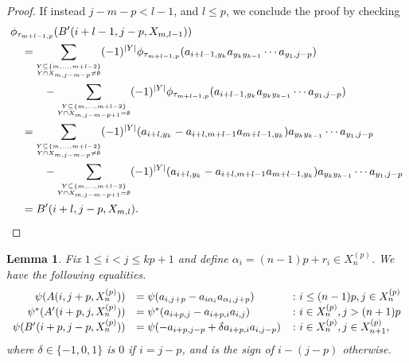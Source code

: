 \documentclass[11pt]{amsart}
\def\a{\alpha}
\newtheorem{lem}[thm]{Lemma}
\theoremstyle{definition}
\begin{document}
\begin{proof}
If instead $j-m-p <l - 1$, and $l\le p$, we conclude the proof by checking
{\small
\begin{align*}
&\phi_{\tau_{m + l - 1,p}}(B'(i+l-1,j-p,X_{m,l-1})) \\
&\quad = \sum_{{\scriptscriptstyle \overset{Y\subseteq \{m,\ldots,m+l-2\}}{Y\cap X_{m,j-m-p}\ne\emptyset}}}(-1)^{|Y|}\phi_{\tau_{m + l - 1,p}}(a_{i+l-1,y_k}a_{y_ky_{k-1}}\cdots a_{y_1,j-p}) \\
&\qquad\quad - \sum_{{\scriptscriptstyle \overset{Y\subseteq \{m,\ldots,m+l-2\}}{Y\cap X_{m,j-m-p+1}=\emptyset}}}(-1)^{|Y|}\phi_{\tau_{m + l - 1,p}}(a_{i+l-1,y_k}a_{y_ky_{k-1}}\cdots a_{y_1,j-p}) \\
&\quad = \sum_{{\scriptscriptstyle \overset{Y\subseteq \{m,\ldots,m+l-2\}}{Y\cap X_{m,j-m-p}\ne\emptyset}}}(-1)^{|Y|}(a_{i+l,y_k} - a_{i+l,m+l-1}a_{m+l-1,y_k})a_{y_ky_{k-1}}\cdots a_{y_1,j-p} \\
&\qquad\quad - \sum_{{\scriptscriptstyle \overset{Y\subseteq \{m,\ldots,m+l-2\}}{Y\cap X_{m,j-m-p+1}=\emptyset}}}(-1)^{|Y|}(a_{i+l,y_k} - a_{i+l,m+l-1}a_{m+l-1,y_k})a_{y_ky_{k-1}}\cdots a_{y_1,j-p} \\
&\quad = B'(i+l,j-p,X_{m,l}). \qedhere
\end{align*}
}
\end{proof}


\begin{lem}\label{SimplifiedImages}
Fix $1\le i< j\le kp+1$ and define $\a_i = (n-1)p+r_i\in X_n^{(p)}$. We have the following equalities.
  \[\begin{array}{r l l} \psi(A(i,j+p,X_n^{(p)}))   &= \psi(a_{i,j+p} - a_{i\a_i}a_{\a_i,j+p})      & \colon i\le(n-1)p, j\in X_n^{(p)}\\
                  \psi^*(A'(i+p,j,X_n^{(p)})) &= \psi^*(a_{i+p,j} - a_{i+p,i}a_{i,j})       & \colon i\in X_n^{(p)}, j>(n+1)p\\
                \psi(B'(i+p,j-p,X_n^{(p)})) &= \psi(-a_{i+p,j-p} + \delta a_{i+p,i}a_{i,j-p}) & \colon i\in X_n^{(p)}, j\in X_{n+1}^{(p)},
  \end{array}\]
\noindent where $\delta\in\{-1,0,1\}$ is $0$ if $i=j-p$, and is the sign of $i-(j-p)$ otherwise.
\end{lem}
\end{document}
